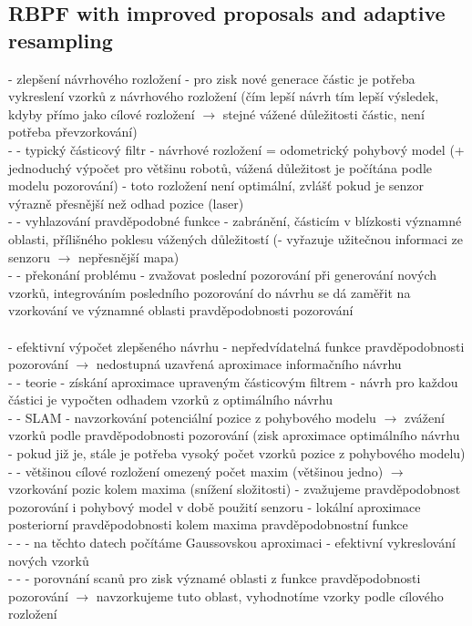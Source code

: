 \documentclass[11pt]{article}
\begin{document}
\subsection{RBPF with improved proposals and adaptive resampling}
- zlepšení návrhového rozložení - pro zisk nové generace částic je potřeba vykreslení vzorků z návrhového rozložení (čím lepší návrh tím lepší výsledek, kdyby přímo jako cílové rozložení $\rightarrow$ stejné vážené důležitosti částic, není potřeba převzorkování)\\
- - typický částicový filtr - návrhové rozložení = odometrický pohybový model (+ jednoduchý výpočet pro většinu robotů, vážená důležitost je počítána podle modelu pozorování) - toto rozložení není optimální, zvlášť pokud je senzor výrazně přesnější než odhad pozice (laser)\\ 
- - vyhlazování pravděpodobné funkce - zabránění, částicím v blízkosti významné oblasti, přílišného poklesu vážených důležitostí (- vyřazuje užitečnou informaci ze senzoru $\rightarrow$ nepřesnější mapa)\\
- - překonání problému - zvažovat poslední pozorování při generování nových vzorků, integrováním posledního pozorování do návrhu se dá zaměřit na vzorkování ve významné oblasti pravděpodobnosti pozorování\\
\\
- efektivní výpočet zlepšeného návrhu - nepředvídatelná funkce pravděpodobnosti pozorování $\rightarrow$ nedostupná uzavřená aproximace informačního návrhu\\
- - teorie - získání aproximace upraveným částicovým filtrem - návrh pro každou částici je vypočten odhadem vzorků z optimálního návrhu\\
- - SLAM - navzorkování potenciální pozice z pohybového modelu $\rightarrow$ zvážení vzorků podle pravděpodobnosti pozorování (zisk aproximace optimálního návrhu - pokud již je, stále je potřeba vysoký počet vzorků pozice z pohybového modelu)\\
- - většinou cílové rozložení omezený počet maxim (většinou jedno) $\rightarrow$ vzorkování pozic kolem maxima (snížení složitosti) - zvažujeme pravděpodobnost pozorování i pohybový model v době použití senzoru - lokální aproximace posteriorní pravděpodobnosti kolem maxima pravděpodobnostní funkce\\
- - - na těchto datech počítáme Gaussovskou aproximaci - efektivní vykreslování nových vzorků\\
- - - porovnání scanů pro zisk významé oblasti z funkce pravděpodobnosti pozorování $\rightarrow$ navzorkujeme tuto oblast, vyhodnotíme vzorky podle cílového rozložení\\
\end{document}
